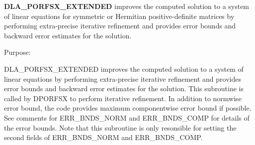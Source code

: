 {\bfseries D\+L\+A\+\_\+\+P\+O\+R\+F\+S\+X\+\_\+\+E\+X\+T\+E\+N\+D\+E\+D} improves the computed solution to a system of linear equations for symmetric or Hermitian positive-\/definite matrices by performing extra-\/precise iterative refinement and provides error bounds and backward error estimates for the solution. 

 \begin{DoxyParagraph}{Purpose\+: }
\begin{DoxyVerb} DLA_PORFSX_EXTENDED improves the computed solution to a system of
 linear equations by performing extra-precise iterative refinement
 and provides error bounds and backward error estimates for the solution.
 This subroutine is called by DPORFSX to perform iterative refinement.
 In addition to normwise error bound, the code provides maximum
 componentwise error bound if possible. See comments for ERR_BNDS_NORM
 and ERR_BNDS_COMP for details of the error bounds. Note that this
 subroutine is only resonsible for setting the second fields of
 ERR_BNDS_NORM and ERR_BNDS_COMP.\end{DoxyVerb}
 
\end{DoxyParagraph}

